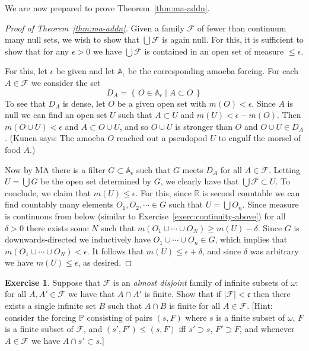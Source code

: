 \documentclass[11pt,oneside]{amsbook}
\newcommand{\set}[1]{\left\{\,#1\,\right\}}
\newcommand{\PP}{\mathbb P}
\theoremstyle{definition}
\newtheorem{exerc}{Exercise}[section]
\theoremstyle{plain}
\theoremstyle{definition}
\theoremstyle{remark}
\begin{document}
We are now prepared to prove Theorem~\ref{thm:ma-addn}.

\begin{proof}[Proof of Theorem~\ref{thm:ma-addn}]
  Given a family $\mathcal F$ of fewer than continuum many null sets, we wish to show that $\bigcup\mathcal F$ is again null. For this, it is sufficient to show that for any $\epsilon>0$ we have $\bigcup\mathcal F$ is contained in an open set of measure $\leq\epsilon$.

  For this, let $\epsilon$ be given and let $\mathbb A_\epsilon$ be the corresponding amoeba forcing. For each $A\in\mathcal F$ we consider the set
  \[D_A=\set{O\in\mathbb A_\epsilon\mid A\subset O}
  \]
  To see that $D_A$ is dense, let $O$ be a given open set with $m(O)<\epsilon$. Since $A$ is null we can find an open set $U$ such that $A\subset U$ and $m(U)<\epsilon-m(O)$. Then $m(O\cup U)<\epsilon$ and $A\subset O\cup U$, and so $O\cup U$ is stronger than $O$ and $O\cup U\in D_A$. (Kunen says: The amoeba $O$ reached out a pseudopod $U$ to engulf the morsel of food $A$.)

  Now by MA there is a filter $G\subset\mathbb A_\epsilon$ such that $G$ meets $D_A$ for all $A\in\mathcal F$. Letting $U=\bigcup G$ be the open set determined by $G$, we clearly have that $\bigcup\mathcal F\subset U$. To conclude, we claim that $m(U)\leq\epsilon$. For this, since $\mathbb R$ is second countable we can find countably many elements $O_1,O_2,\cdots\in G$ such that $U=\bigcup O_n$. Since measure is continuous from below (similar to Exercise~\ref{exerc:continuity-above}) for all $\delta>0$ there exists some $N$ such that $m(O_1\cup\cdots\cup O_N)\geq m(U)-\delta$. Since $G$ is downwards-directed we inductively have $O_1\cup\cdots\cup O_n\in G$, which implies that $m(O_1\cup\cdots\cup O_N)<\epsilon$. It follows that $m(U)\leq\epsilon+\delta$, and since $\delta$ was arbitrary we have $m(U)\leq\epsilon$, as desired.
\end{proof}

\begin{exerc}
  Suppose that $\mathcal F$ is an \emph{almost disjoint} family of infinite subsets of $\omega$: for all $A,A'\in\mathcal F$ we have that $A\cap A'$ is finite. Show that if $|\mathcal F|<\mathfrak c$ then there exists a single infinite set $B$ such that $A\cap B$ is finite for all $A\in\mathcal F$. [Hint: consider the forcing $\PP$ consisting of pairs $(s,F)$ where $s$ is a finite subset of $\omega$, $F$ is a finite subset of $\mathcal F$, and $(s',F')\leq(s,F)$ iff $s'\supset s$, $F'\supset F$, and whenever $A\in\mathcal F$ we have $A\cap s'\subset s$.]
\end{exerc}
\end{document}
